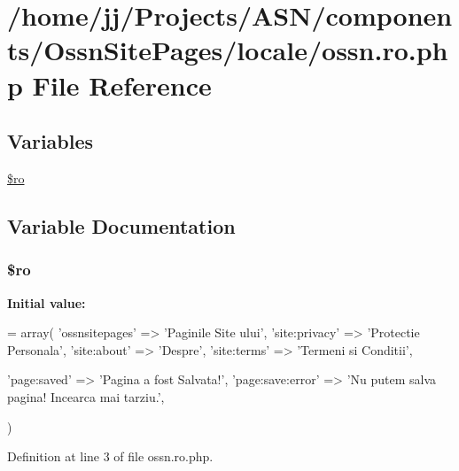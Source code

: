 \hypertarget{components_2_ossn_site_pages_2locale_2ossn_8ro_8php}{}\section{/home/jj/\+Projects/\+A\+S\+N/components/\+Ossn\+Site\+Pages/locale/ossn.ro.\+php File Reference}
\label{components_2_ossn_site_pages_2locale_2ossn_8ro_8php}
\subsection*{Variables}
\begin{DoxyCompactItemize}
\item 
\hyperlink{components_2_ossn_site_pages_2locale_2ossn_8ro_8php_ad432e1965f7fa8ce0807b244734e70f8}{\$ro}
\end{DoxyCompactItemize}


\subsection{Variable Documentation}
\subsubsection[{\texorpdfstring{\$ro}{$ro}}]{\setlength{\rightskip}{0pt plus 5cm}\$ro}\hypertarget{components_2_ossn_site_pages_2locale_2ossn_8ro_8php_ad432e1965f7fa8ce0807b244734e70f8}{}\label{components_2_ossn_site_pages_2locale_2ossn_8ro_8php_ad432e1965f7fa8ce0807b244734e70f8}
{\bfseries Initial value\+:}
\begin{DoxyCode}
= array(
    \textcolor{stringliteral}{'ossnsitepages'} => \textcolor{stringliteral}{'Paginile Site ului'},
    \textcolor{stringliteral}{'site:privacy'} => \textcolor{stringliteral}{'Protectie Personala'},
    \textcolor{stringliteral}{'site:about'} => \textcolor{stringliteral}{'Despre'},
    \textcolor{stringliteral}{'site:terms'} => \textcolor{stringliteral}{'Termeni si Conditii'},

    \textcolor{stringliteral}{'page:saved'} => \textcolor{stringliteral}{'Pagina a fost Salvata!'},
    \textcolor{stringliteral}{'page:save:error'} => \textcolor{stringliteral}{'Nu putem salva pagina! Incearca mai tarziu.'},

)
\end{DoxyCode}


Definition at line 3 of file ossn.\+ro.\+php.

